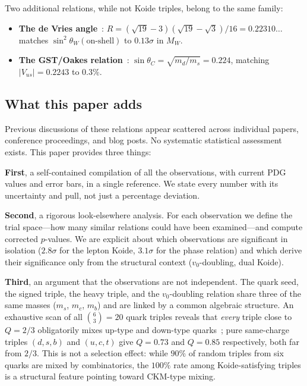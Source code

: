 \documentclass[12pt,a4paper]{article}
\begin{document}
Two additional relations, while not Koide triples, belong to the same family:

\begin{itemize}
\item \textbf{The de Vries angle}~\cite{Rivero2005b}:
  $R = (\sqrt{19}-3)(\sqrt{19}-\sqrt{3})/16 = 0.22310\ldots$ matches
  $\sin^2\theta_W(\text{on-shell})$ to $0.13\sigma$ in $M_W$.

\item \textbf{The GST/Oakes relation}~\cite{GST1968}:
  $\sin\theta_C = \sqrt{m_d/m_s} = 0.224$, matching $|V_{us}| = 0.2243$ to $0.3\%$.
\end{itemize}

\subsection{What this paper adds}

Previous discussions of these relations appear scattered across individual papers,
conference proceedings, and blog posts.  No systematic statistical assessment exists.
This paper provides three things:

\textbf{First}, a self-contained compilation of all the observations, with current PDG values
and error bars, in a single reference.  We state every number with its uncertainty and
pull, not just a percentage deviation.

\textbf{Second}, a rigorous look-elsewhere analysis.  For each observation we define the trial
space---how many similar relations could have been examined---and compute corrected
$p$-values.  We are explicit about which observations are significant in isolation
($2.8\sigma$ for the lepton Koide, $3.1\sigma$ for the phase relation) and which derive
their significance only from the structural context ($v_0$-doubling, dual Koide).

\textbf{Third}, an argument that the observations are not independent.  The quark seed, the
signed triple, the heavy triple, and the $v_0$-doubling relation share three of the same
masses ($m_s$, $m_c$, $m_b$) and are linked by a common algebraic structure.
An exhaustive scan of all $\binom{6}{3} = 20$ quark triples reveals that \emph{every} triple
close to $Q = 2/3$ obligatorily mixes up-type and down-type quarks~\cite{Rivero2012}; pure
same-charge triples $(d,s,b)$ and $(u,c,t)$ give $Q = 0.73$ and $Q = 0.85$
respectively, both far from $2/3$.  This is not a selection effect: while $90\%$ of
random triples from six quarks are mixed by combinatorics, the $100\%$ rate among
Koide-satisfying triples is a structural feature pointing toward CKM-type mixing.
\end{document}
